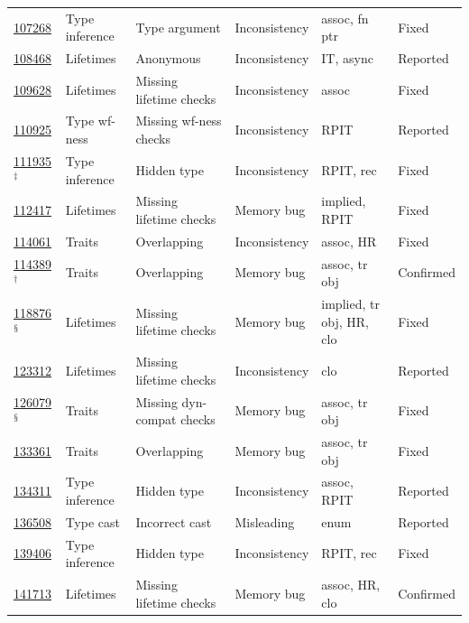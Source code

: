 \begin{table}[t]
{\begin{tabular}{l|l|l|l|l|l}
\href{https://github.com/rust-lang/rust/issues/107268}{107268}&Type inference&Type argument&Inconsistency&assoc, fn ptr&Fixed\\
\href{https://github.com/rust-lang/rust/issues/108468}{108468}&Lifetimes&Anonymous&Inconsistency&IT, async&Reported\\
\href{https://github.com/rust-lang/rust/issues/109628}{109628}&Lifetimes&Missing lifetime checks&Inconsistency&assoc&Fixed\\
\href{https://github.com/rust-lang/rust/issues/110925}{110925}&Type wf-ness&Missing wf-ness checks&Inconsistency&RPIT&Reported\\
\href{https://github.com/rust-lang/rust/issues/111935}{111935}$^\ddag$&Type inference&Hidden type&Inconsistency&RPIT, rec&Fixed\\
\href{https://github.com/rust-lang/rust/issues/112417}{112417}&Lifetimes&Missing lifetime checks&Memory bug&implied, RPIT&Fixed\\
\href{https://github.com/rust-lang/rust/issues/114061}{114061}&Traits&Overlapping&Inconsistency&assoc, HR&Fixed\\
\href{https://github.com/rust-lang/rust/issues/114389}{114389}$^\dag$&Traits&Overlapping&Memory bug&assoc, tr obj&Confirmed\\
\href{https://github.com/rust-lang/rust/issues/118876}{118876}$^\mathsection$& Lifetimes & Missing lifetime checks & Memory bug & implied, tr obj, HR, clo & Fixed \\
\href{https://github.com/rust-lang/rust/issues/123312}{123312}&Lifetimes&Missing lifetime checks&Inconsistency&clo&Reported\\
\href{https://github.com/rust-lang/rust/issues/126079}{126079}$^\mathsection$& Traits & Missing dyn-compat checks & Memory bug & assoc, tr obj & Fixed \\
\href{https://github.com/rust-lang/rust/issues/133361}{133361}&Traits&Overlapping&Memory bug&assoc, tr obj&Fixed\\
\href{https://github.com/rust-lang/rust/issues/134311}{134311}&Type inference&Hidden type&Inconsistency&assoc, RPIT&Reported\\
\href{https://github.com/rust-lang/rust/issues/136508}{136508}&Type cast&Incorrect cast&Misleading&enum&Reported\\
\href{https://github.com/rust-lang/rust/issues/139406}{139406}&Type inference&Hidden type&Inconsistency&RPIT, rec&Fixed\\
\href{https://github.com/rust-lang/rust/issues/141713}{141713}&Lifetimes&Missing lifetime checks&Memory bug&assoc, HR, clo&Confirmed\\

\end{tabular}}
\end{table}
